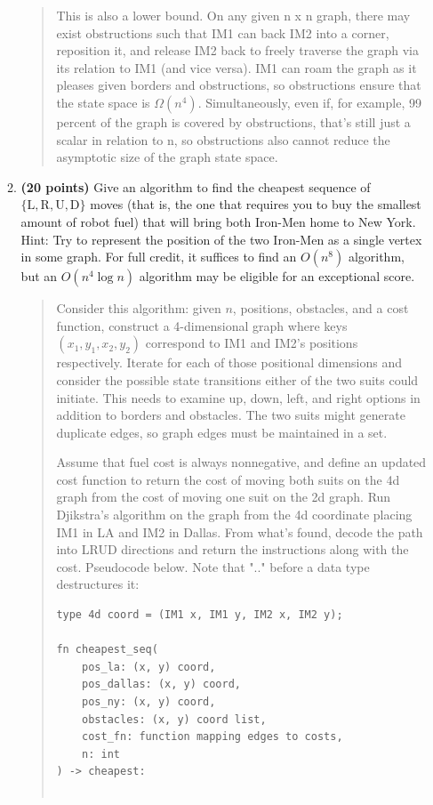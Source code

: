 \documentclass[11pt]{article}
\begin{document}
\begin{enumerate}
\begin{enumerate}
\begin{quote}
        \medskip 
        This is also a lower bound. On any given n x n graph, there may exist obstructions such that IM1 can back IM2 into a corner, reposition it, and release IM2 back to freely traverse the graph 
via its relation to IM1 (and vice versa). IM1 can roam the graph as it pleases given borders and obstructions, so obstructions ensure that the state space is $\Omega(n^4)$. Simultaneously, even if, for example, 99 percent of the graph is covered by obstructions, that's still just a scalar in relation to n, so obstructions also cannot reduce the asymptotic size of the graph state space.
      \end{quote}
    \item {\bf (20 points)} Give an algorithm to find the cheapest sequence of $\{\mathrm{L}, \mathrm{R}, \mathrm{U}, \mathrm{D}\}$ moves (that is, the one that requires you to buy the smallest amount of robot fuel) that will bring both Iron-Men home to New York.
Hint: Try to represent the position of the two Iron-Men as a single vertex in some graph. For full credit, it suffices to find an $O\left(n^8\right)$ algorithm, but an $O\left(n^4 \log n\right)$ algorithm may be eligible for an exceptional score.
\begin{quote}
  \color{purple}
  Consider this algorithm: given $n$, positions, obstacles, and a cost function, construct a 4-dimensional graph where keys $(x_1, y_1, x_2, y_2)$ correspond to IM1 and IM2's positions respectively. Iterate for each of those positional dimensions and consider the possible state transitions either of the two suits could initiate. This needs to examine up, down, left, and right options in addition to borders and obstacles. The two suits might generate duplicate edges, so graph edges must be maintained in a set. 

  \medskip 
  Assume that fuel cost is always nonnegative, and define an updated cost function to return the cost of moving both suits on the 4d graph from the cost of moving one suit on the 2d graph. Run Djikstra's algorithm on the graph from the 4d coordinate placing IM1 in LA and IM2 in Dallas. From what's found, decode the path into LRUD directions and return the instructions along with the cost. Pseudocode below. Note that ".." before a data type destructures it: 

\begin{Verbatim}[xleftmargin=-6em]
type 4d coord = (IM1 x, IM1 y, IM2 x, IM2 y);

fn cheapest_seq(
    pos_la: (x, y) coord,
    pos_dallas: (x, y) coord,
    pos_ny: (x, y) coord,
    obstacles: (x, y) coord list,
    cost_fn: function mapping edges to costs,
    n: int
) -> cheapest:
    

\end{Verbatim}
\end{quote}
\end{enumerate}
\end{enumerate}
\end{document}
